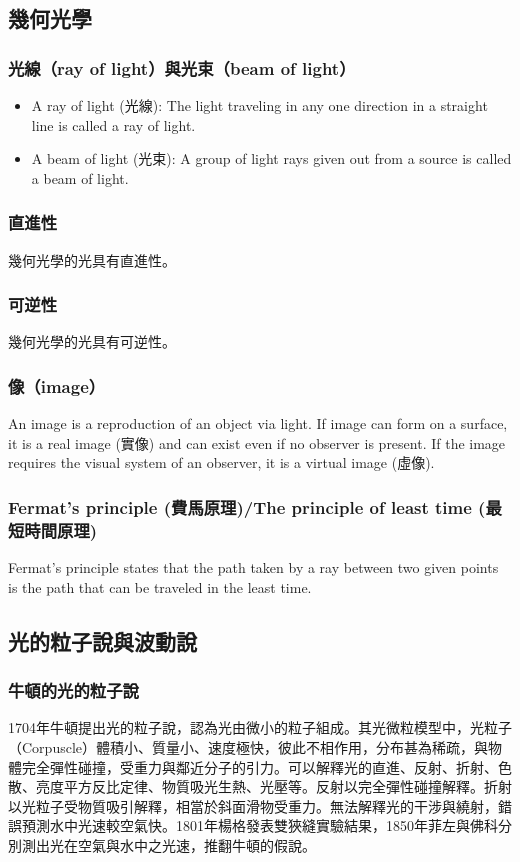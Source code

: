 \documentclass[a4paper,12pt]{report}
\begin{document}
\subsection{幾何光學}
\subsubsection{光線（ray of light）與光束（beam of light）}
\begin{itemize}
\item A ray of light (光線): The light traveling in any one direction in a straight line is called a ray of light.
\item A beam of light (光束): A group of light rays given out from a source is called a beam of light.
\end{itemize}
\subsubsection{直進性}
幾何光學的光具有直進性。
\subsubsection{可逆性}
幾何光學的光具有可逆性。
\subsubsection{像（image）}
An image is a reproduction of an object via light. If image can form on a surface, it is a real image (實像) and can exist even if no observer is present. If the image requires the visual system of an observer, it is a virtual image (虛像).
\subsubsection{Fermat's principle (費馬原理)/The principle of least time (最短時間原理)}
Fermat's principle states that the path taken by a ray between two given points is the path that can be traveled in the least time.
\subsection{光的粒子說與波動說}
\subsubsection{牛頓的光的粒子說}
1704年牛頓提出光的粒子說，認為光由微小的粒子組成。其光微粒模型中，光粒子（Corpuscle）體積小、質量小、速度極快，彼此不相作用，分布甚為稀疏，與物體完全彈性碰撞，受重力與鄰近分子的引力。可以解釋光的直進、反射、折射、色散、亮度平方反比定律、物質吸光生熱、光壓等。反射以完全彈性碰撞解釋。折射以光粒子受物質吸引解釋，相當於斜面滑物受重力。無法解釋光的干涉與繞射，錯誤預測水中光速較空氣快。1801年楊格發表雙狹縫實驗結果，1850年菲左與佛科分別測出光在空氣與水中之光速，推翻牛頓的假說。
\end{document}
